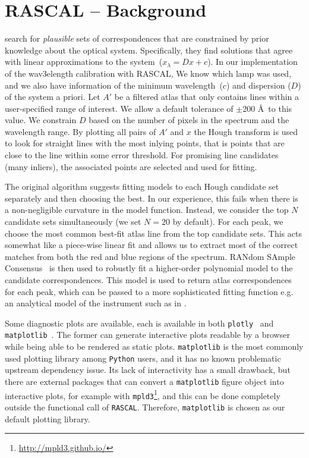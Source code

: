 \documentclass[fleqn,usenatbib]{rasti}
\begin{document}
\section{RASCAL -- Background}
\citet{2018ApOpt..57.6876S} search for \textit{plausible} sets of
correspondences that are constrained by prior knowledge about the optical system.
Specifically, they find solutions that agree with linear approximations to the
system~($x_\lambda = Dx + c$). In our implementation of the wav3elength calibration
with RASCAL, We know which lamp was used, and we also have information of the minimum wavelength~($c$) and dispersion ($D$) of the system a priori. Let $A'$ be
a filtered atlas that only contains lines within a user-specified range of interest.
We allow a default tolerance of $\pm 200$ \AA~to this value. We constrain $D$ based on
the number of pixels in the spectrum and the wavelength range. By plotting all pairs of $A'$ and $x$ the Hough transform is used to look for straight lines with the most inlying points, that is points that are close to the line within some error threshold. For promising line candidates (many inliers), the associated points are selected and used for fitting.

The original algorithm suggests fitting models to each Hough candidate set separately
and then choosing the best. In our experience, this fails when there is a non-negligible
curvature in the model function. Instead, we consider the top $N$ candidate sets
simultaneously (we set $N = 20$ by default). For each peak, we choose the most common
best-fit atlas line from the top candidate sets. This acts somewhat like a piece-wise
linear fit and allows us to extract most of the correct matches from both the red and
blue regions of the spectrum. RANdom SAmple
Consensus~\citep[RANSAC][]{fischler_bolles_1981} is then used to robustly fit
a higher-order polynomial model to the candidate correspondences. This model is used
to return atlas correspondences for each peak, which can be passed to a more
sophisticated fitting function e.g. an analytical model of the instrument such as
in \citet{2013OptEn..52a3603L}.

Some diagnostic plots are available, each is available in both
\texttt{plotly}~\citep{plotly} and \texttt{matplotlib}~\citep{Hunter:2007, thomas_a_caswell_2021_4743323}. The former can generate interactive plots
readable by a browser while being able to be rendered as static plots.
\texttt{matplotlib} is the most commonly used plotting library
among \texttt{Python} users, and it has no known problematic upstream dependency
issue. Its lack of interactivity has a small drawback, but there are external
packages that can convert a \texttt{matplotlib} figure object into interactive plots,
for example with \texttt{mpld3}\footnote{\url{http://mpld3.github.io/}}, and this
can be done completely outside the functional call of \texttt{RASCAL}. Therefore,
\texttt{matplotlib} is chosen as our default plotting library.
\end{document}
